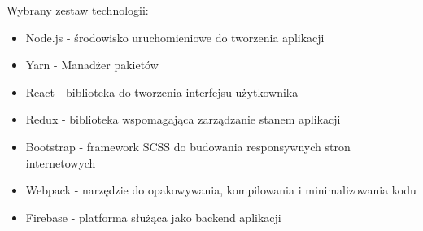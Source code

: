 Wybrany zestaw technologii:
\begin{itemize}
    \item Node.js - środowisko uruchomieniowe do tworzenia aplikacji
    \item Yarn - Manadżer pakietów
    \item React -  biblioteka do tworzenia interfejsu użytkownika
    \item Redux - biblioteka wspomagająca zarządzanie stanem aplikacji
    \item Bootstrap - framework SCSS do budowania responsywnych stron internetowych
    \item Webpack - narzędzie do opakowywania, kompilowania i minimalizowania kodu
    \item Firebase - platforma służąca jako backend aplikacji
\end{itemize}
